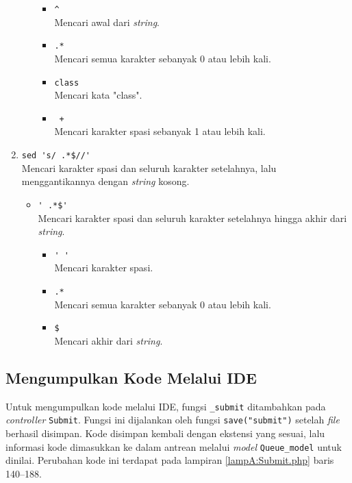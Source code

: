 \begin{enumerate}
\begin{itemize}
        \begin{itemize}
            \item \verb|^| \\ Mencari awal dari \textit{string}.
            \item \verb|.*| \\ Mencari semua karakter sebanyak 0 atau lebih kali.
            \item \verb|class| \\  Mencari kata "class".
             \item \verb| +| \\ Mencari karakter spasi sebanyak 1 atau lebih kali.
        \end{itemize}
    \end{itemize}
    \item \verb|sed 's/ .*$//'| \\ Mencari karakter spasi dan seluruh karakter setelahnya, lalu menggantikannya dengan \textit{string} kosong.
    \begin{itemize}
        \item \verb|' .*$'| \\ Mencari karakter spasi dan seluruh karakter setelahnya hingga akhir dari \textit{string}.
        \begin{itemize}
            \item \verb|' '| \\ Mencari karakter spasi.
            \item \verb|.*| \\ Mencari semua karakter sebanyak 0 atau lebih kali.
            \item \verb|$| \\ Mencari akhir dari \textit{string}.
        \end{itemize}
    \end{itemize}
\end{enumerate}


\subsection{Mengumpulkan Kode Melalui IDE}
\label{subsec:5:kumpul}

Untuk mengumpulkan kode melalui IDE, fungsi \verb|_submit| ditambahkan pada \textit{controller} \verb|Submit|. Fungsi ini dijalankan oleh fungsi \verb|save("submit")| setelah \textit{file} berhasil disimpan. Kode disimpan kembali dengan ekstensi yang sesuai, lalu informasi kode dimasukkan ke dalam antrean melalui \textit{model} \verb|Queue_model| untuk dinilai. Perubahan kode ini terdapat pada lampiran \ref{lampA:Submit.php} baris 140--188.

